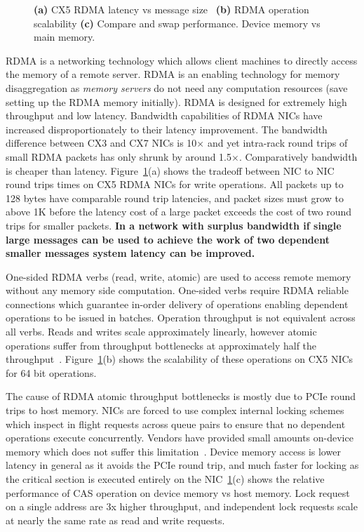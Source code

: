 \begin{figure}[t]
\begin{subfigure}{0.3\linewidth}
    \end{subfigure}
    \vspace{-1em}
    \caption{
    \textbf{(a)} CX5 RDMA latency vs message size~\cite{rdma-latency}
    \textbf{(b)} RDMA operation scalability
    \textbf{(c)} Compare and swap performance. Device memory vs main memory.
    }
    \label{fig:rdma-benchmarks}
\end{figure}

RDMA is a networking technology which allows client machines
to directly access the memory of a remote server. RDMA is an
enabling technology for memory disaggregation as
\textit{memory servers} do not need any computation
resources (save setting up the RDMA memory initially). RDMA
is designed for extremely high throughput and low latency.
Bandwidth capabilities of RDMA NICs have increased
disproportionately to their latency improvement. The
bandwidth difference between CX3 and CX7 NICs is 10$\times$ and yet
intra-rack round trips of small RDMA packets has only shrunk
by around 1.5$\times$. Comparatively bandwidth is cheaper than
latency. Figure~\ref{fig:rdma-benchmarks}(a) shows the tradeoff
between NIC to NIC round trips times on CX5 RDMA NICs for
write operations. All packets up to 128 bytes have
comparable round trip latencies, and packet sizes must grow
to above 1K before the latency cost of a large packet exceeds the
cost of two round trips for smaller packets. \textbf{In a network
with surplus bandwidth if single large messages can be used
to achieve the work of two dependent smaller messages system
latency can be improved.}

One-sided RDMA verbs (read, write, atomic) are used to
access remote memory without any memory side computation.
One-sided verbs require RDMA reliable connections which
guarantee in-order delivery of operations enabling dependent
operations to be issued in batches. Operation throughput is
not equivalent across all verbs. Reads and writes scale
approximately linearly, however atomic operations suffer
from throughput bottlenecks at approximately half the
throughput~\cite{design-guidelines,sherman}.
Figure~\ref{fig:rdma-benchmarks}(b) shows the scalability of
these operations on CX5 NICs for 64 bit operations.

The cause of RDMA atomic throughput bottlenecks is mostly
due to PCIe round trips to host memory. NICs are forced to
use complex internal locking schemes which inspect in flight
requests across queue pairs to ensure that no dependent
operations execute concurrently. Vendors have provided small
amounts on-device memory which does not suffer this
limitation~\cite{device-memory}. Device memory access is
lower latency in general as it avoids the PCIe round trip,
and much faster for locking as the critical section is
executed entirely on the NIC~\ref{fig:rdma-benchmarks}(c)
shows the relative performance of CAS operation on device
memory vs host memory. Lock request on a single address are
3x higher throughput, and independent lock requests scale at
nearly the same rate as read and write requests.

